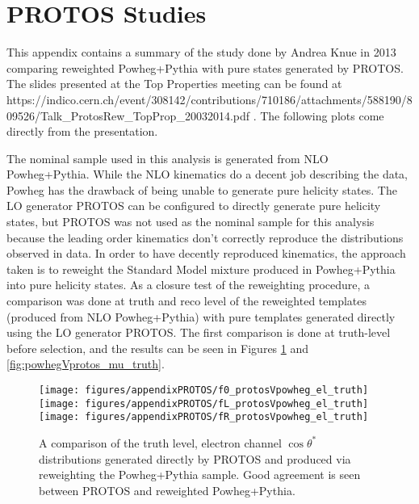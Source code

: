 \clearpage
\section{PROTOS Studies}
\label{app:protosStudies}
This appendix contains a summary of the study done by Andrea Knue in 2013 comparing reweighted Powheg+Pythia with pure states generated by PROTOS. The slides presented at the Top Properties meeting can be found at https://indico.cern.ch/event/308142/contributions/710186/attachments/588190/809526/Talk\_ProtosRew\_TopProp\_20032014.pdf . The following plots come directly from the presentation.

The nominal \ttbar sample used in this analysis is generated from NLO Powheg+Pythia. While the NLO kinematics do a decent job describing the data, Powheg has the drawback of being unable to generate pure helicity states. The LO generator PROTOS can be configured to directly generate pure helicity states, but PROTOS was not used as the nominal sample for this analysis because the leading order kinematics don't correctly reproduce the distributions observed in data. In order to have decently reproduced kinematics, the approach taken is to reweight the Standard Model mixture produced in Powheg+Pythia into pure helicity states. As a closure test of the reweighting procedure, a comparison was done at truth and reco level of the reweighted templates (produced from NLO Powheg+Pythia) with pure templates generated directly using the LO generator PROTOS. The first comparison is done at truth-level before selection, and the results can be seen in Figures \ref{fig:powhegVprotos_el_truth} and \ref{fig:powhegVprotos_mu_truth}.

\begin{figure}[htbp]
\begin{center}
		\texttt{[image: figures/appendixPROTOS/f0\_protosVpowheg\_el\_truth]}
		\texttt{[image: figures/appendixPROTOS/fL\_protosVpowheg\_el\_truth]}
		\texttt{[image: figures/appendixPROTOS/fR\_protosVpowheg\_el\_truth]}
	\caption{A comparison of the truth level, electron channel $\cos\theta^*$ distributions generated directly by PROTOS and produced via reweighting the Powheg+Pythia sample. Good agreement is seen between PROTOS and reweighted Powheg+Pythia.}
	\label{fig:powhegVprotos_el_truth}
\end{center}	
\end{figure}

